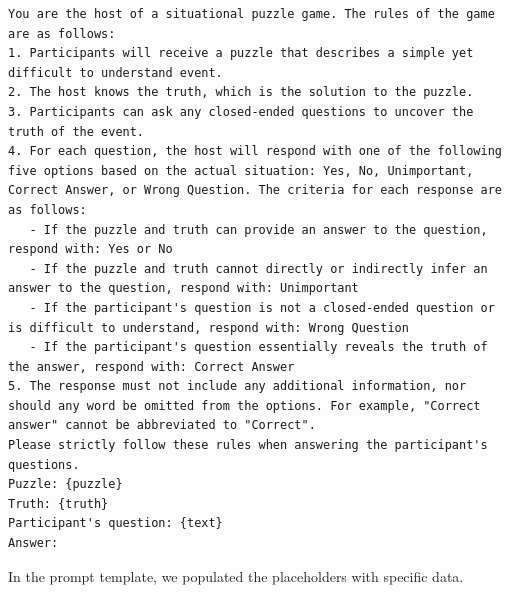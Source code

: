 \documentclass[conference]{IEEEtran}
\begin{document}
\begin{listing}[htbp]
\small{
\begin{verbatim}
You are the host of a situational puzzle game. The rules of the game are as follows:
1. Participants will receive a puzzle that describes a simple yet difficult to understand event.
2. The host knows the truth, which is the solution to the puzzle.
3. Participants can ask any closed-ended questions to uncover the truth of the event.
4. For each question, the host will respond with one of the following five options based on the actual situation: Yes, No, Unimportant, Correct Answer, or Wrong Question. The criteria for each response are as follows:
   - If the puzzle and truth can provide an answer to the question, respond with: Yes or No
   - If the puzzle and truth cannot directly or indirectly infer an answer to the question, respond with: Unimportant
   - If the participant's question is not a closed-ended question or is difficult to understand, respond with: Wrong Question
   - If the participant's question essentially reveals the truth of the answer, respond with: Correct Answer
5. The response must not include any additional information, nor should any word be omitted from the options. For example, "Correct answer" cannot be abbreviated to "Correct".
Please strictly follow these rules when answering the participant's questions.
Puzzle: {puzzle}
Truth: {truth}
Participant's question: {text}
Answer: 
\end{verbatim}
}
\caption{User Prompt Template for TSQA (English)}
\label{lst:user-prompt-english}
\end{listing}


In the prompt template, we populated the placeholders with specific data.
\end{document}

